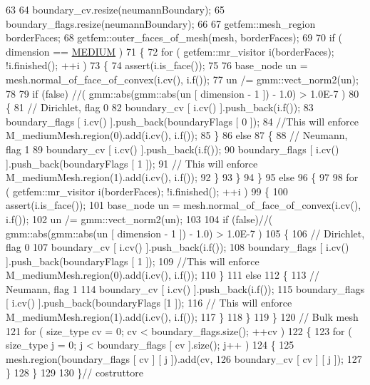 \begin{DoxyCode}
63 
64     boundary\_cv.resize(neumannBoundary);
65     boundary\_flags.resize(neumannBoundary);
66 
67     getfem::mesh\_region borderFaces;
68     getfem::outer\_faces\_of\_mesh(mesh, borderFaces);
69 
70     \textcolor{keywordflow}{if} ( dimension == \hyperlink{Core_8h_a419d7707e418f02d8daeb1fc7c0b9ae5a5340ec7ecef6cc3886684a3bd3450d64}{MEDIUM} )
71     \{
72         \textcolor{keywordflow}{for} ( getfem::mr\_visitor i(borderFaces); !i.finished(); ++i )
73         \{
74             assert(i.is\_face());
75 
76             base\_node un = mesh.normal\_of\_face\_of\_convex(i.cv(), i.f());
77             un /= gmm::vect\_norm2(un);
78 
79             \textcolor{keywordflow}{if}  (\textcolor{keyword}{false})  \textcolor{comment}{//( gmm::abs(gmm::abs(un [ dimension - 1 ]) - 1.0) > 1.0E-7 )}
80             \{
81                 \textcolor{comment}{// Dirichlet, flag 0}
82                 boundary\_cv [ i.cv() ].push\_back(i.f());
83                 boundary\_flags [ i.cv() ].push\_back(boundaryFlags [ 0 ]);
84                 \textcolor{comment}{//This        will enforce M\_mediumMesh.region(0).add(i.cv(), i.f());}
85             \}
86             \textcolor{keywordflow}{else}
87             \{
88                 \textcolor{comment}{// Neumann, flag 1}
89                 boundary\_cv [ i.cv() ].push\_back(i.f());
90                 boundary\_flags [ i.cv() ].push\_back(boundaryFlags [ 1 ]);
91                 \textcolor{comment}{// This will enforce M\_mediumMesh.region(1).add(i.cv(), i.f());}
92             \}
93         \}
94     \}
95     \textcolor{keywordflow}{else}
96     \{
97 
98         \textcolor{keywordflow}{for} ( getfem::mr\_visitor i(borderFaces); !i.finished(); ++i )
99         \{
100             assert(i.is\_face());
101             base\_node un = mesh.normal\_of\_face\_of\_convex(i.cv(), i.f());
102             un /= gmm::vect\_norm2(un);
103 
104             \textcolor{keywordflow}{if} (\textcolor{keyword}{false})\textcolor{comment}{//( gmm::abs(gmm::abs(un [ dimension - 1 ]) - 1.0) > 1.0E-7 )}
105             \{
106             \textcolor{comment}{// Dirichlet, flag 0}
107             boundary\_cv [ i.cv() ].push\_back(i.f());
108             boundary\_flags [ i.cv() ].push\_back(boundaryFlags [ 1 ]);
109             \textcolor{comment}{//This        will enforce M\_mediumMesh.region(0).add(i.cv(), i.f());}
110         \}
111         \textcolor{keywordflow}{else}
112             \{
113                 \textcolor{comment}{// Neumann, flag 1}
114                 boundary\_cv [ i.cv() ].push\_back(i.f());
115                 boundary\_flags [ i.cv() ].push\_back(boundaryFlags [1 ]);
116                 \textcolor{comment}{// This will enforce M\_mediumMesh.region(1).add(i.cv(), i.f());}
117             \}
118         \}
119     \}
120     \textcolor{comment}{// Bulk mesh}
121     \textcolor{keywordflow}{for} ( size\_type cv = 0; cv < boundary\_flags.size(); ++cv )
122     \{
123         \textcolor{keywordflow}{for} ( size\_type j = 0; j < boundary\_flags [ cv ].size(); j++ )
124         \{
125             mesh.region(boundary\_flags [ cv ] [ j ]).add(cv,
126                     boundary\_cv [ cv ] [ j ]);
127         \}
128     \}
129 
130 \}\textcolor{comment}{// costruttore}
\end{DoxyCode}


